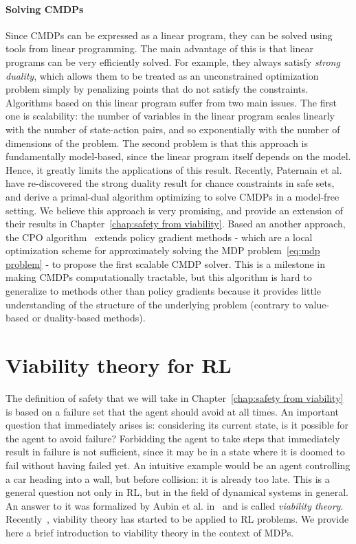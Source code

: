 		\paragraph{Solving CMDPs} Since CMDPs can be expressed as a linear program, they can be solved using tools from linear programming. The main advantage of this is that linear programs can be very efficiently solved. For example, they always satisfy\emph{ strong duality}, which allows them to be treated as an unconstrained optimization problem simply by penalizing points that do not satisfy the constraints. Algorithms based on this linear program suffer from two main issues. The first one is scalability: the number of variables in the linear program scales linearly with the number of state-action pairs, and so exponentially with the number of dimensions of the problem. The second problem is that this approach is fundamentally model-based, since the linear program itself depends on the model. Hence, it greatly limits the applications of this result. Recently, Paternain et al.~\cite{paternain2019safe} have re-discovered the strong duality result for chance constraints in safe sets, and derive a primal-dual algorithm optimizing to solve CMDPs in a model-free setting. We believe this approach is very promising, and provide an extension of their results in Chapter~\ref{chap:safety from viability}. Based an another approach, the CPO algorithm~\cite{achiam2017constrained} extends policy gradient methods - which are a local optimization scheme for approximately solving the MDP problem~\eqref{eq:mdp problem} - to propose the first scalable CMDP solver. This is a milestone in making CMDPs computationally tractable, but this algorithm is hard to generalize to methods other than policy gradients because it provides little understanding of the structure of the underlying problem (contrary to value-based or duality-based methods).
		
	\section{Viability theory for RL} \label{sec:preliminary viability}
	The definition of safety that we will take in Chapter~\ref{chap:safety from viability} is based on a failure set that the agent should avoid at all times. An important question that immediately arises is: considering its current state, is it possible for the agent to avoid failure? Forbidding the agent to take steps that immediately result in failure is not sufficient, since it may be in a state where it is doomed to fail without having failed yet. An intuitive example would be an agent controlling a car heading into a wall, but before collision: it is already too late. This is a general question not only in RL, but in the field of dynamical systems in general. An answer to it was formalized by Aubin et al. in~\cite{aubin2011viability} and is called\emph{ viability theory}. Recently~\cite{heim2020learnable}, viability theory has started to be applied to RL problems. We provide here a brief introduction to viability theory in the context of MDPs.
